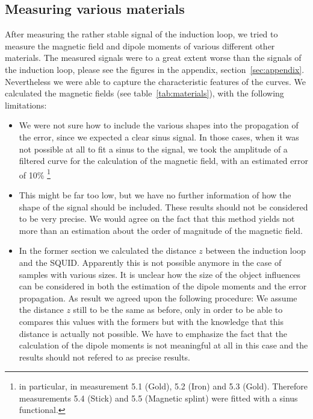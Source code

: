 \subsection{Measuring various materials}
After measuring the rather stable signal of the induction loop, we tried to measure
the magnetic field and dipole moments of various different other materials. 
The measured signals were to a great extent worse than the signals of the induction loop,
please see the figures in the appendix, section~\ref{sec:appendix}. Nevertheless
we were able to capture the characteristic features of the curves. We calculated the
magnetic fields (see table~\ref{tab:materials}), with the following limitations: 
\begin{itemize}
\item We were not sure how to include the various shapes into the propagation of the error, since
we expected a clear sinus signal. In those cases, when it was not possible at all to fit a sinus
to the signal, we took the amplitude of a filtered curve for the calculation of the magnetic field, with
an estimated error of 10\% \footnote{in particular, in measurement 5.1 (Gold), 5.2 (Iron) and 5.3 (Gold).
Therefore measurements 5.4 (Stick) and 5.5 (Magnetic splint) were fitted with a sinus functional.} 
\item This might be far too low, but we have no further information of how
the shape of the signal should be included. These results should not be considered to be very precise.
We would agree on the fact that this method yields not more than an estimation about the order
of magnitude of the magnetic field.
\item In the former section we calculated the distance $z$ between the induction loop and the 
SQUID. Apparently this is not possible anymore in the case of samples with various sizes. It is
unclear how the size of the object influences can be considered in both the estimation of the 
dipole moments and the error propagation. As result we agreed upon the following procedure:
We assume the distance $z$ still to be the same as before, only in order to be able to 
compares this values with the formers but with the knowledge that this distance is actually not 
possible. We have to emphasize the fact that the calculation of the dipole moments is not meaningful
at all in this case and the results should not refered to as precise results.
\end{itemize}

